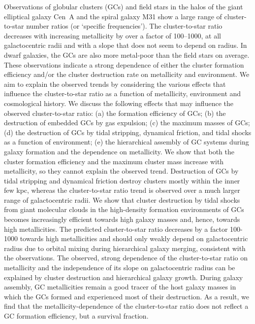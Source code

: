 \documentclass{aa}
\begin{document}
  \abstract
  { 
  Observations of globular clusters (GCs) and field stars in the halos of the giant elliptical galaxy Cen~A and the spiral galaxy M31 show a large range of cluster-to-star number ratios (or `specific frequencies'). The cluster-to-star ratio decreases with increasing metallicity by over a factor of 100--1000, at all galactocentric radii and with a slope that does not seem to depend on radius. In dwarf galaxies, the GCs are also more metal-poor than the field stars on average. These observations indicate a strong dependence of either the cluster formation efficiency and/or the cluster destruction rate on metallicity and environment.
  }
  {
  We aim to explain the observed trends by considering the various effects that influence the cluster-to-star ratio as a function of metallicity, environment and cosmological history.
  }
{ 
  We discuss the following effects that may influence the observed cluster-to-star ratio:
    (a) the formation efficiency of GCs; 
    (b) the destruction of embedded GCs by gas expulsion;
    (c) the maximum masses of GCs;
    (d) the destruction of GCs by tidal stripping, dynamical friction, and tidal shocks as a function of environment;
    (e) the hierarchical assembly of GC systems during galaxy formation and the dependence on metallicity.
}
{
    We show that both the cluster formation efficiency and the maximum cluster mass increase with metallicity, so they cannot explain the observed trend. Destruction of GCs by tidal stripping and dynamical friction destroy clusters mostly within the inner few kpc, whereas the cluster-to-star ratio trend is observed over a much larger range of galactocentric radii. We show that cluster destruction by tidal shocks from giant molecular clouds in the high-density formation environments of GCs becomes increasingly efficient towards high galaxy masses and, hence, towards high metallicities. The predicted cluster-to-star ratio decreases by a factor 100-1000 towards high metallicities and should only weakly depend on galactocentric radius due to orbital mixing during hierarchical galaxy merging, consistent with the observations.
 }
{ 
The observed, strong dependence of the cluster-to-star ratio on metallicity and the independence of its slope on galactocentric radius can be explained by cluster destruction and hierarchical galaxy growth. During galaxy assembly, GC metallicities remain a good tracer of the host galaxy masses in which the GCs formed and experienced most of their destruction. As a result, we find that the metallicity-dependence of the cluster-to-star ratio does not reflect a GC formation efficiency, but a survival fraction.
}
\end{document}

